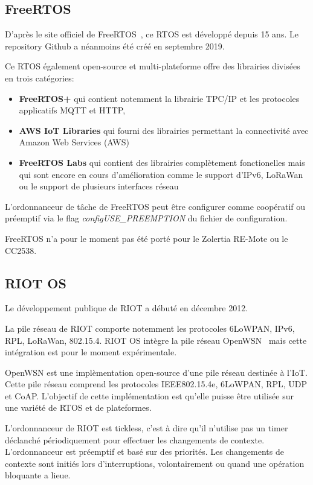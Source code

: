 \subsection*{FreeRTOS}
    D'après le site officiel de FreeRTOS~\cite{freertos}, ce RTOS est développé depuis 15 ans.
    Le repository Github a néanmoins été créé en septembre 2019.

    Ce RTOS également open-source et multi-plateforme offre des librairies divisées en trois catégories:
    \begin{itemize}

        \item \textbf{FreeRTOS+} qui contient notemment la librairie TPC/IP et les protocoles applicatifs MQTT et HTTP,
        \item \textbf{AWS IoT Libraries} qui fourni des librairies permettant la connectivité avec Amazon Web Services (AWS)
        \item \textbf{FreeRTOS Labs} qui contient des librairies complètement fonctionelles mais qui sont encore en cours d'amélioration comme le support d'IPv6, LoRaWan ou le support de plusieurs interfaces réseau
    \end{itemize}
    
    
    L'ordonnanceur de tâche de FreeRTOS peut être configurer comme coopératif ou préemptif via le flag \textit{configUSE\_PREEMPTION} du fichier de configuration.

    FreeRTOS n'a pour le moment pas été porté pour le Zolertia RE-Mote ou le CC2538.

\subsection*{RIOT OS}
    Le développement publique de RIOT a débuté en décembre 2012\footnotemark[1].

    La pile réseau de RIOT comporte notemment les protocoles 6LoWPAN, IPv6, RPL, LoRaWan, 802.15.4.
    RIOT OS intègre la pile réseau OpenWSN~\cite{openwsn} mais cette intégration est pour le moment expérimentale.
    
    OpenWSN est une implèmentation open-source d'une pile réseau destinée à l'IoT. Cette pile réseau comprend les protocoles IEEE802.15.4e, 6LoWPAN, RPL, UDP et CoAP. L'objectif de cette implémentation est qu'elle puisse être utilisée sur une variété de RTOS et de plateformes.
    
    L'ordonnanceur de RIOT est tickless, c'est à dire qu'il n'utilise pas un timer déclanché périodiquement pour effectuer les changements de contexte. L'ordonnanceur est préemptif et basé sur des priorités. Les changements de contexte sont initiés lors d'interruptions, volontairement ou quand une opération bloquante a lieue. 

